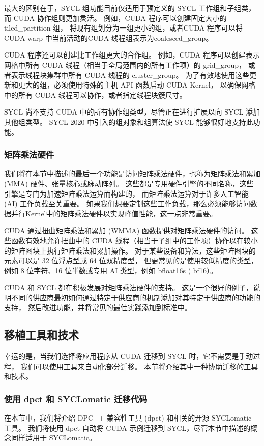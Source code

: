 最大的区别在于，SYCL 组功能目前仅适用于预定义的 SYCL 工作组和子组类，而 CUDA 协作组则更加灵活。 
例如，CUDA 程序可以创建固定大小的tiled\_partition 组，
将现有组划分为一组更小的组，或者CUDA 程序可以将CUDA warp 中当前活动的CUDA 线程组表示为coalesced\_group。

CUDA 程序还可以创建比工作组更大的合作组。 
例如，CUDA 程序可以创建表示网格中所有 CUDA 线程（相当于全局范围内的所有工作项）的 grid\_group，
或者表示线程块集群中所有 CUDA 线程的 cluster\_group。 
为了有效地使用这些更新和更大的组，必须使用特殊的主机 API 函数启动 CUDA Kernel，
以确保网格中的所有 CUDA 线程可以协作，或者指定线程块簇尺寸。

SYCL 尚不支持 CUDA 中的所有协作组类型，尽管正在进行扩展以向 SYCL 添加其他组类型。 
SYCL 2020 中引入的组对象和组算法使 SYCL 能够很好地支持此功能。

\subsubsection{矩阵乘法硬件}
我们将在本节中描述的最后一个功能是访问矩阵乘法硬件，也称为矩阵乘法和累加 (MMA) 硬件、张量核心或脉动阵列。 
这些都是专用硬件引擎的不同名称，这些引擎是专门为加速矩阵乘法运算而构建的，
而矩阵乘法运算对于许多人工智能 (AI) 工作负载至关重要。 
如果我们想要定制这些工作负载，那么必须能够访问数据并行Kernel中的矩阵乘法硬件以实现峰值性能，这一点非常重要。

CUDA 通过扭曲矩阵乘法和累加 (WMMA) 函数提供对矩阵乘法硬件的访问。 
这些函数有效地允许扭曲中的 CUDA 线程（相当于子组中的工作项）协作以在较小的矩阵图块上执行矩阵乘法和累加操作。 
对于某些设备和算法，这些矩阵图块的元素可以是 32 位浮点型或 64 位双精度型，
但更常见的是使用较低精度的类型，例如 8 位字符、16 位半数或专用 AI 类型，例如 bfloat16s ( bf16）。

CUDA 和 SYCL 都在积极发展对矩阵乘法硬件的支持。 
这是一个很好的例子，说明不同的供应商最初如何通过特定于供应商的机制添加对其特定于供应商的功能的支持，
然后改进功能，并将常见的最佳实践添加到标准中。

\subsection{移植工具和技术}
幸运的是，当我们选择将应用程序从 CUDA 迁移到 SYCL 时，它不需要是手动过程，
我们可以使用工具来自动化部分迁移。 本节将介绍其中一种协助迁移的工具和技术。

\subsubsection{使用 dpct 和 SYCLomatic 迁移代码}
在本节中，我们将介绍 DPC++ 兼容性工具 (dpct) 和相关的开源 SYCLomatic 工具。 
我们将使用 dpct 自动将 CUDA 示例迁移到 SYCL，尽管本节中描述的概念同样适用于 SYCLomatic。

